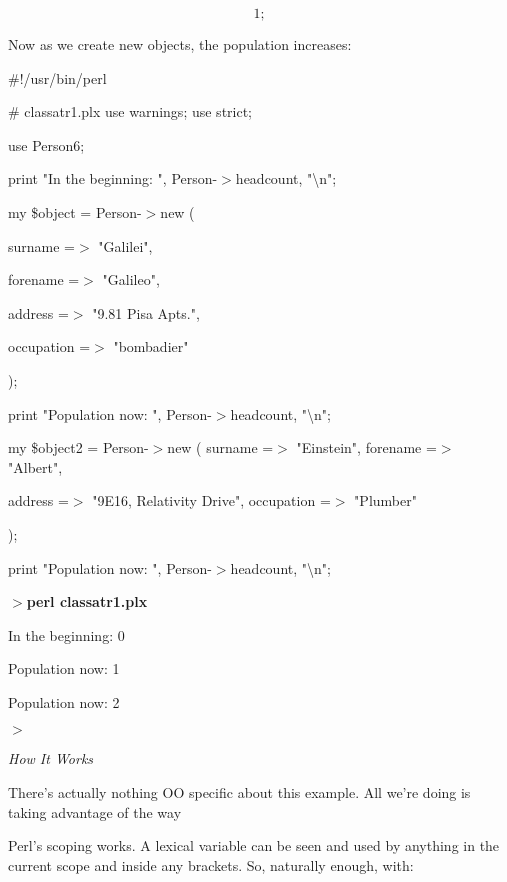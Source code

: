 \documentclass[a4paper,11pt]{book}
\begin{document}
\noindent 

\[1;\] 


\noindent 

\noindent Now as we create new objects, the population increases:

\noindent 

\noindent \#!/usr/bin/perl

\noindent \# classatr1.plx use warnings; use strict;

\noindent use Person6;

\noindent 

\noindent print "In the beginning: ", Person-$>$headcount, "\textbackslash n";

\noindent my \$object = Person-$>$new (

\noindent surname =$>$ "Galilei",

\noindent forename =$>$ "Galileo",

\noindent address =$>$ "9.81 Pisa Apts.",

\noindent occupation =$>$ "bombadier"

\noindent );

\noindent print "Population now: ", Person-$>$headcount, "\textbackslash n";

\noindent 

\noindent my \$object2 = Person-$>$new ( surname =$>$ "Einstein", forename =$>$ "Albert",

\noindent address =$>$ "9E16, Relativity Drive", occupation =$>$ "Plumber"

\noindent );

\noindent print "Population now: ", Person-$>$headcount, "\textbackslash n";

\noindent 

\noindent $>$\textbf{perl classatr1.plx}

\noindent In the beginning: 0

\noindent Population now: 1

\noindent Population now: 2

\noindent $>$

\noindent 

\noindent \textit{How It Works}

\noindent There's actually nothing OO specific about this example. All we're doing is taking advantage of the way

\noindent Perl's scoping works. A lexical variable can be seen and used by anything in the current scope and inside any brackets. So, naturally enough, with:
\end{document}
